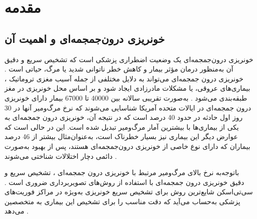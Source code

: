 \chapter{مقدمه}

\section{ خونریزی درون‌جمجمه‌ای و اهمیت آن}

خونریزی‌ درون‌جمجمه‌ای
یک وضعیت اضطراری پزشکی است که تشخیص سریع و دقیق آن به‌منظور درمان مؤثر بیمار و کاهش خطر ناتوانی شدید یا مرگ، حیاتی است \cite{grewal2018radnet}.
خونریزی درون جمجمه‌ای
می‌تواند به دلایل مختلفی از جمله آسیب مغزی تروماتیک
، بیماری‌های عروقی، یا مشکلات مادرزادی ایجاد شود و بر اساس محل خونریزی در مغز طبقه‌بندی می‌شود \cite{monica2022detection}.
 به‌صورت تقریبی سالانه بین 40000 تا 67000 بیمار دارای
خونریزی درون جمجمه‌ای
   در ایالات متحده آمریکا شناسایی می‌شوند که نرخ مرگ‌ومیر آنها در 30 روز اول حادثه در حدود 40 درصد است که در نتیجه آن، 
خونریزی درون جمجمه‌ای
   به یکی از بیماری‌ها با بیشترین آمار مرگ‌ومیر تبدیل شده است. این در حالی است که عوارض دیگر این بیماری نیز بسیار خطرناک است، به‌عنوان‌مثال بیشتر از 46 درصد بیماران که دارای نوع خاصی از خونریزی درون‌جمجمه‌ای هستند، پس از بهبود به‌صورت دائمی دچار اختلالات شناختی می‌شوند
 \cite{arbabshirani2018advanced,burduja2020accurate,morgenstern2010guidelines,van2010incidence,hackett2000health}.

  باتوجه‌به نرخ بالای مرگ‌ومیر مرتبط با 
  خونریزی درون جمجمه‌ای
  ، تشخیص سریع و دقیق 
  خونریزی درون جمجمه‌ای
  با استفاده از روش‌های تصویربرداری ضروری است \cite{kuo2019expert}. سی‌تی‌اسکن
   شایع‌ترین روش برای تشخیص سریع خونریزی به‌ویژه در مراکز فوریت‌های پزشکی به‌حساب می‌آید که دقت مناسب را برای تشخیص این بیماری به متخصصین می‌دهد \cite{ye2019precise,grewal2018radnet,arbabshirani2018advanced,chilamkurthy2018deep}.


